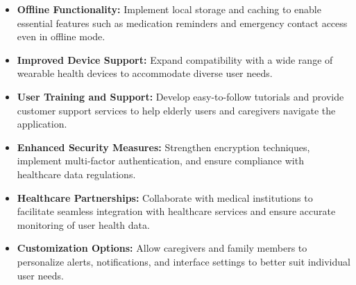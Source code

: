\begin{itemize}
    \item \textbf{Offline Functionality:} Implement local storage and caching to enable essential features such as medication reminders and emergency contact access even in offline mode.
    \item \textbf{Improved Device Support:} Expand compatibility with a wide range of wearable health devices to accommodate diverse user needs.
    \item \textbf{User Training and Support:} Develop easy-to-follow tutorials and provide customer support services to help elderly users and caregivers navigate the application.
    \item \textbf{Enhanced Security Measures:} Strengthen encryption techniques, implement multi-factor authentication, and ensure compliance with healthcare data regulations.
    \item \textbf{Healthcare Partnerships:} Collaborate with medical institutions to facilitate seamless integration with healthcare services and ensure accurate monitoring of user health data.
    \item \textbf{Customization Options:} Allow caregivers and family members to personalize alerts, notifications, and interface settings to better suit individual user needs.
\end{itemize}

